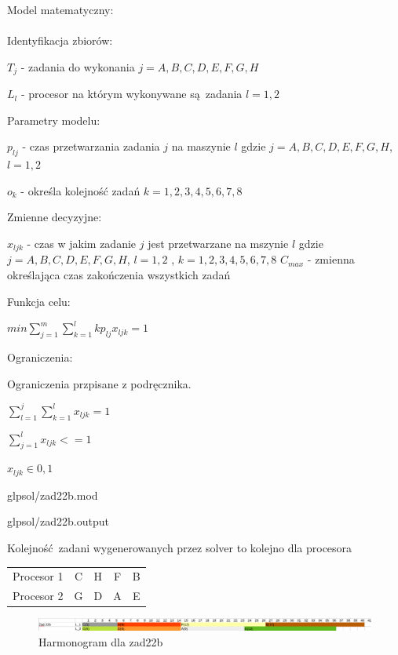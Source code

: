 \documentclass{article}
\begin{document}
\noindent Model matematyczny: \\\\

\noindent Identyfikacja zbiorów:

$T_j$ - zadania do wykonania $j = {A,B,C,D,E,F,G,H}$

$L_{l}$ - procesor na którym wykonywane są zadania $l = {1,2}$

\noindent Parametry modelu:

$p_{lj}$ - czas przetwarzania zadania $j$ na maszynie $l$ gdzie $j = {A,B,C,D,E,F,G,H}$, $l = {1,2}$

$o_k$  - określa kolejność zadań $k = {1,2,3,4,5,6,7,8}$

\noindent Zmienne decyzyjne:

$x_{ljk}$ - czas w jakim zadanie $j$ jest przetwarzane na mszynie $l$ gdzie $j = {A,B,C,D,E,F,G,H}$, $l = {1,2}$ , $k = {1,2,3,4,5,6,7,8}$
$C_{max}$ - zmienna określająca czas zakończenia wszystkich zadań

\noindent Funkcja celu:

$min \sum^{m}_{j=1}\sum^{l}_{k=1} k p_{lj} x_{ljk} = 1$ 

\noindent Ograniczenia:

Ograniczenia przpisane z podręcznika.

$\sum^{j}_{l=1} \sum^{l}_{k=1} x_{ljk} = 1$

$\sum^{l}_{j=1} x_{ljk} <= 1$

$x_{ljk} \in {0,1}$



{glpsol/zad22b.mod}


{glpsol/zad22b.output}

Kolejność zadani wygenerowanych przez solver to kolejno dla procesora

\begin{table}[H]
	\centering
	\begin{tabular}{| c | c | c | c | c |}
		Procesor 1 & C & H & F & B \\
		Procesor 2 & G & D & A & E \\
	\end{tabular}
\end{table}


\begin{figure}[h]    
  \centering 
  \includegraphics[width=\linewidth]{others/zad22b_harmonogram.png}
  \caption{Harmonogram dla zad22b}
\end{figure}
\end{document}
